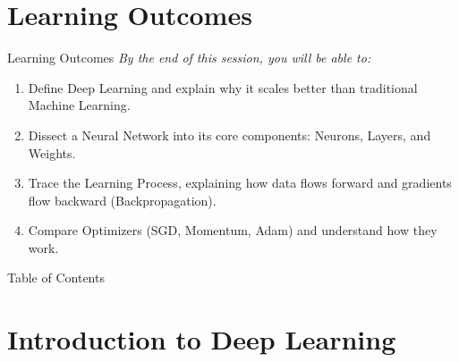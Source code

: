 \section{Learning Outcomes}
\begin{frame}{Learning Outcomes}
    \vspace{0.5em}
    \textit{By the end of this session, you will be able to:}
    
    \vspace{1em}
    \begin{enumerate}
        \setlength\itemsep{1.2em} %
        
        \item Define Deep Learning and explain why it scales better than traditional Machine Learning.
        
        \item Dissect a Neural Network into its core components: Neurons, Layers, and Weights.
        
        \item Trace the Learning Process, explaining how data flows forward and gradients flow backward (Backpropagation).
        
        \item Compare Optimizers (SGD, Momentum, Adam) and understand how they work.
    \end{enumerate}
\end{frame}

\begin{frame}[allowframebreaks]{Table of Contents}
    \tableofcontents
\end{frame}

\section{Introduction to Deep Learning}

